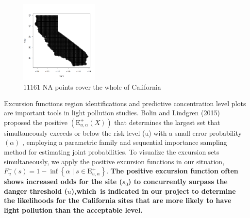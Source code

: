 \documentclass{mcmthesis}
\begin{document}
\begin{figure}[htb]
    \centering
    \includegraphics[width=0.35\textwidth]{images/11361.png}
    \caption{11161 NA points cover the whole of California}
    \label{pre1}
\end{figure}
\newpage
Excursion functions region identifications and predictive concentration level plots are important tools in light pollution studies. Bolin and Lindgren (2015) proposed the positive  $\left(\mathrm{E}_{u, \alpha}^{+}(X)\right)$ that determines the largest set that simultaneously exceeds or below the risk level  (u)  with a small error probability  $(\alpha)$ , employing a parametric family and sequential importance sampling method for estimating joint probabilities. To visualize the excursion sets simultaneously, we apply the positive excursion functions in our situation,  $F_{u}^{+}(s)=1-\inf \left\{\alpha \mid s \in \mathrm{E}_{u, \alpha}^{+}\right\}$.
\textbf{The positive excursion function often shows increased odds for the site ($s_{0}$) to concurrently surpass the danger threshold ($u$),which is indicated in our project to determine the likelihoods for the California sites that are more likely to have light pollution than the acceptable level.}
\end{document}
